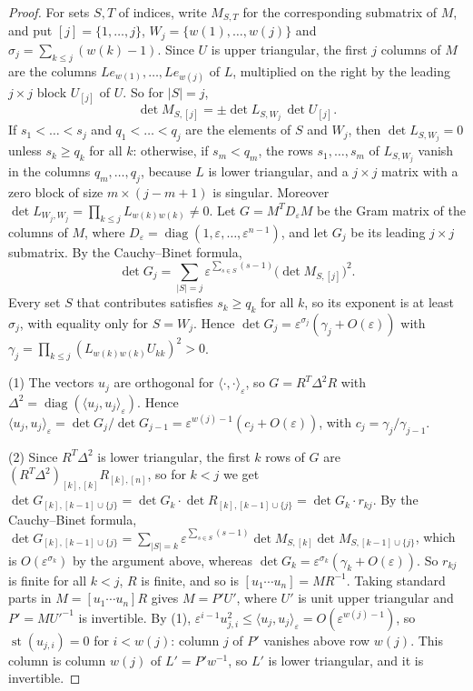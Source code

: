 \documentclass[12pt, a4paper]{report}
\theoremstyle{plain}
\theoremstyle{definition}
\theoremstyle{remark}
\theoremstyle{plain}
\newcommand{\st}{\operatorname{st}}
\DeclareMathOperator{\diag}{diag}
\begin{document}
\begin{proof}
For sets $S,T$ of indices, write $M_{S,T}$ for the corresponding submatrix of $M$, and put $[j]=\{1,\dots,j\}$, $W_j=\{w(1),\dots,w(j)\}$ and $\sigma_j=\sum_{k\leq j}(w(k)-1)$. Since $U$ is upper triangular, the first $j$ columns of $M$ are the columns $Le_{w(1)},\dots,Le_{w(j)}$ of $L$, multiplied on the right by the leading $j\times j$ block $U_{[j]}$ of $U$. So for $|S|=j$,
\[ \det M_{S,[j]}=\pm\det L_{S,W_j}\,\det U_{[j]} . \]
If $s_1<\dots<s_j$ and $q_1<\dots<q_j$ are the elements of $S$ and $W_j$, then $\det L_{S,W_j}=0$ unless $s_k\geq q_k$ for all $k$: otherwise, if $s_m<q_m$, the rows $s_1,\dots,s_m$ of $L_{S,W_j}$ vanish in the columns $q_m,\dots,q_j$, because $L$ is lower triangular, and a $j\times j$ matrix with a zero block of size $m\times(j-m+1)$ is singular. Moreover $\det L_{W_j,W_j}=\prod_{k\leq j}L_{w(k)w(k)}\neq0$. Let $G=M^TD_\varepsilon M$ be the Gram matrix of the columns of $M$, where $D_\varepsilon=\diag(1,\varepsilon,\dots,\varepsilon^{n-1})$, and let $G_j$ be its leading $j\times j$ submatrix. By the Cauchy--Binet formula,
\[ \det G_j=\sum_{|S|=j}\varepsilon^{\sum_{s\in S}(s-1)}\bigl(\det M_{S,[j]}\bigr)^2 . \]
Every set $S$ that contributes satisfies $s_k\geq q_k$ for all $k$, so its exponent is at least $\sigma_j$, with equality only for $S=W_j$. Hence $\det G_j=\varepsilon^{\sigma_j}(\gamma_j+O(\varepsilon))$ with $\gamma_j=\prod_{k\leq j}(L_{w(k)w(k)}U_{kk})^2>0$.

(1) The vectors $u_j$ are orthogonal for $\langle\cdot,\cdot\rangle_\varepsilon$, so $G=R^T\Delta^2R$ with $\Delta^2=\diag(\langle u_j,u_j\rangle_\varepsilon)$. Hence $\langle u_j,u_j\rangle_\varepsilon=\det G_j/\det G_{j-1}=\varepsilon^{w(j)-1}(c_j+O(\varepsilon))$, with $c_j=\gamma_j/\gamma_{j-1}$.

(2) Since $R^T\Delta^2$ is lower triangular, the first $k$ rows of $G$ are $(R^T\Delta^2)_{[k],[k]}R_{[k],[n]}$, so for $k<j$ we get $\det G_{[k],[k-1]\cup\{j\}}=\det G_k\cdot\det R_{[k],[k-1]\cup\{j\}}=\det G_k\cdot r_{kj}$. By the Cauchy--Binet formula, $\det G_{[k],[k-1]\cup\{j\}}=\sum_{|S|=k}\varepsilon^{\sum_{s\in S}(s-1)}\det M_{S,[k]}\det M_{S,[k-1]\cup\{j\}}$, which is $O(\varepsilon^{\sigma_k})$ by the argument above, whereas $\det G_k=\varepsilon^{\sigma_k}(\gamma_k+O(\varepsilon))$. So $r_{kj}$ is finite for all $k<j$, $R$ is finite, and so is $[u_1\cdots u_n]=MR^{-1}$. Taking standard parts in $M=[u_1\cdots u_n]R$ gives $M=P'U'$, where $U'$ is unit upper triangular and $P'=MU'^{-1}$ is invertible. By (1), $\varepsilon^{i-1}u_{j,i}^2\leq\langle u_j,u_j\rangle_\varepsilon=O(\varepsilon^{w(j)-1})$, so $\st(u_{j,i})=0$ for $i<w(j)$: column $j$ of $P'$ vanishes above row $w(j)$. This column is column $w(j)$ of $L'=P'w^{-1}$, so $L'$ is lower triangular, and it is invertible.


\end{proof}
\end{document}
